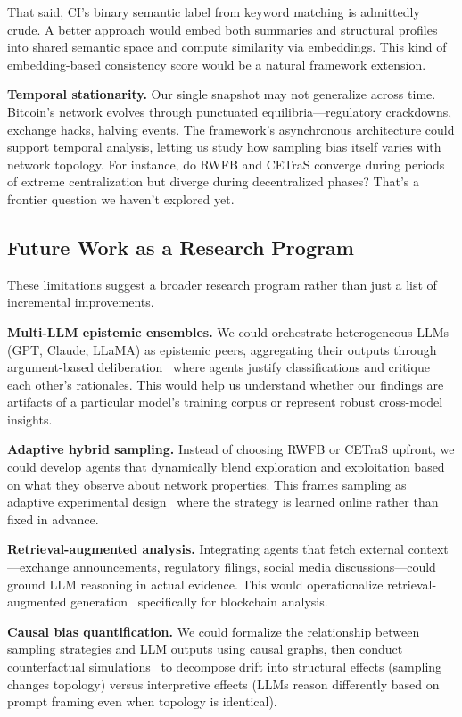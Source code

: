 That said, CI's binary semantic label from keyword matching is admittedly crude. A better approach would embed both summaries and structural profiles into shared semantic space and compute similarity via embeddings. This kind of embedding-based consistency score would be a natural framework extension.

\textbf{Temporal stationarity.} Our single snapshot may not generalize across time. Bitcoin's network evolves through punctuated equilibria---regulatory crackdowns, exchange hacks, halving events. The framework's asynchronous architecture could support temporal analysis, letting us study how sampling bias itself varies with network topology. For instance, do RWFB and CETraS converge during periods of extreme centralization but diverge during decentralized phases? That's a frontier question we haven't explored yet.

\subsection{Future Work as a Research Program}

These limitations suggest a broader research program rather than just a list of incremental improvements.

\textbf{Multi-LLM epistemic ensembles.} We could orchestrate heterogeneous LLMs (GPT, Claude, LLaMA) as epistemic peers, aggregating their outputs through argument-based deliberation~\cite{prakken2018} where agents justify classifications and critique each other's rationales. This would help us understand whether our findings are artifacts of a particular model's training corpus or represent robust cross-model insights.

\textbf{Adaptive hybrid sampling.} Instead of choosing RWFB or CETraS upfront, we could develop agents that dynamically blend exploration and exploitation based on what they observe about network properties. This frames sampling as adaptive experimental design~\cite{murphy2005active} where the strategy is learned online rather than fixed in advance.

\textbf{Retrieval-augmented analysis.} Integrating agents that fetch external context---exchange announcements, regulatory filings, social media discussions---could ground LLM reasoning in actual evidence. This would operationalize retrieval-augmented generation~\cite{lewis2020rag} specifically for blockchain analysis.

\textbf{Causal bias quantification.} We could formalize the relationship between sampling strategies and LLM outputs using causal graphs, then conduct counterfactual simulations~\cite{pearl2009causality} to decompose drift into structural effects (sampling changes topology) versus interpretive effects (LLMs reason differently based on prompt framing even when topology is identical).


